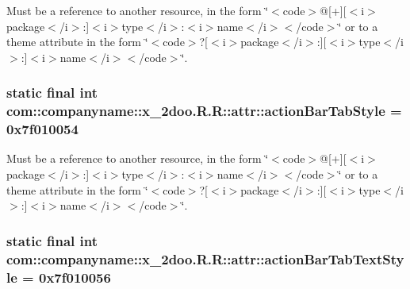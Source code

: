 Must be a reference to another resource, in the form \char`\"{}$<$code$>$@\mbox{[}+\mbox{]}\mbox{[}$<$i$>$package$<$/i$>$:\mbox{]}$<$i$>$type$<$/i$>$:$<$i$>$name$<$/i$>$$<$/code$>$\char`\"{} or to a theme attribute in the form \char`\"{}$<$code$>$?\mbox{[}$<$i$>$package$<$/i$>$:\mbox{]}\mbox{[}$<$i$>$type$<$/i$>$:\mbox{]}$<$i$>$name$<$/i$>$$<$/code$>$\char`\"{}. \hypertarget{classcom_1_1companyname_1_1x__2doo_1_1_r_1_1attr_ea2eb2e736d7bed9fe931b868e54ab6e}{
\subsubsection[{actionBarTabStyle}]{\setlength{\rightskip}{0pt plus 5cm}static final int com::companyname::x\_\-2doo.R.R::attr::actionBarTabStyle = 0x7f010054}}
\label{classcom_1_1companyname_1_1x__2doo_1_1_r_1_1attr_ea2eb2e736d7bed9fe931b868e54ab6e}


Must be a reference to another resource, in the form \char`\"{}$<$code$>$@\mbox{[}+\mbox{]}\mbox{[}$<$i$>$package$<$/i$>$:\mbox{]}$<$i$>$type$<$/i$>$:$<$i$>$name$<$/i$>$$<$/code$>$\char`\"{} or to a theme attribute in the form \char`\"{}$<$code$>$?\mbox{[}$<$i$>$package$<$/i$>$:\mbox{]}\mbox{[}$<$i$>$type$<$/i$>$:\mbox{]}$<$i$>$name$<$/i$>$$<$/code$>$\char`\"{}. \hypertarget{classcom_1_1companyname_1_1x__2doo_1_1_r_1_1attr_384ff21c828ae25ca523d215bf59c157}{
\subsubsection[{actionBarTabTextStyle}]{\setlength{\rightskip}{0pt plus 5cm}static final int com::companyname::x\_\-2doo.R.R::attr::actionBarTabTextStyle = 0x7f010056}}
\label{classcom_1_1companyname_1_1x__2doo_1_1_r_1_1attr_384ff21c828ae25ca523d215bf59c157}


